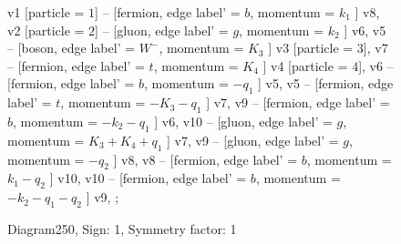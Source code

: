 \documentclass{revtex4}
\begin{document}
\begin{figure}[!htb]
\begin{center}
{    %
v1 [particle = \(1\)] -- [fermion, edge label' = \(b\), momentum = \(k_{1}\) ] v8, 
v2 [particle = \(2\)] -- [gluon, edge label' = \(g\), momentum = \(k_{2}\) ] v6, 
v5 -- [boson, edge label' = \(W^{-}\), momentum = \(K_{3}\) ] v3 [particle = \(3\)], 
v7 -- [fermion, edge label' = \(t\), momentum = \(K_{4}\) ] v4 [particle = \(4\)], 
v6 -- [fermion, edge label' = \(b\), momentum = \(-q_{1}\) ] v5, 
v5 -- [fermion, edge label' = \(t\), momentum = \(-K_{3} - q_{1}\) ] v7, 
v9 -- [fermion, edge label' = \(b\), momentum = \(-k_{2} - q_{1}\) ] v6, 
v10 -- [gluon, edge label' = \(g\), momentum = \(K_{3} + K_{4} + q_{1}\) ] v7, 
v9 -- [gluon, edge label' = \(g\), momentum = \(-q_{2}\) ] v8, 
v8 -- [fermion, edge label' = \(b\), momentum = \(k_{1} - q_{2}\) ] v10, 
v10 -- [fermion, edge label' = \(b\), momentum = \(-k_{2} - q_{1} - q_{2}\) ] v9, 
};
\end{center}
\caption{Diagram250, Sign: 1, Symmetry factor: 1}
\end{figure}
\newpage
\end{document}
